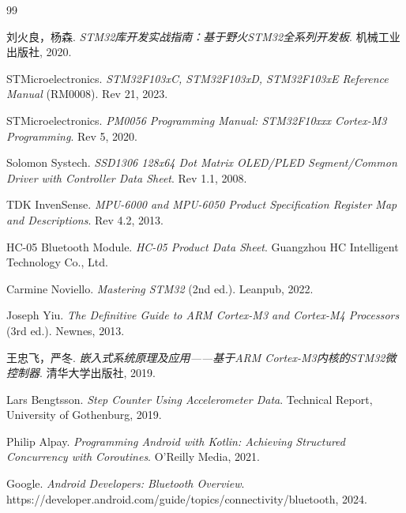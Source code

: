 \begin{thebibliography}{99}

 刘火良，杨森. \textit{STM32库开发实战指南：基于野火STM32全系列开发板}. 机械工业出版社, 2020.

 STMicroelectronics. \textit{STM32F103xC, STM32F103xD, STM32F103xE Reference Manual} (RM0008). Rev 21, 2023.

 STMicroelectronics. \textit{PM0056 Programming Manual: STM32F10xxx Cortex-M3 Programming}. Rev 5, 2020.

 Solomon Systech. \textit{SSD1306 128x64 Dot Matrix OLED/PLED Segment/Common Driver with Controller Data Sheet}. Rev 1.1, 2008.

 TDK InvenSense. \textit{MPU-6000 and MPU-6050 Product Specification Register Map and Descriptions}. Rev 4.2, 2013.

 HC-05 Bluetooth Module. \textit{HC-05 Product Data Sheet}. Guangzhou HC Intelligent Technology Co., Ltd.

 Carmine Noviello. \textit{Mastering STM32} (2nd ed.). Leanpub, 2022.

 Joseph Yiu. \textit{The Definitive Guide to ARM Cortex-M3 and Cortex-M4 Processors} (3rd ed.). Newnes, 2013.

 王忠飞，严冬. \textit{嵌入式系统原理及应用——基于ARM Cortex-M3内核的STM32微控制器}. 清华大学出版社, 2019.

 Lars Bengtsson. \textit{Step Counter Using Accelerometer Data}. Technical Report, University of Gothenburg, 2019.

 Philip Alpay. \textit{Programming Android with Kotlin: Achieving Structured Concurrency with Coroutines}. O'Reilly Media, 2021.

 Google. \textit{Android Developers: Bluetooth Overview}. https://developer.android.com/guide/topics/connectivity/bluetooth, 2024.

\end{thebibliography}